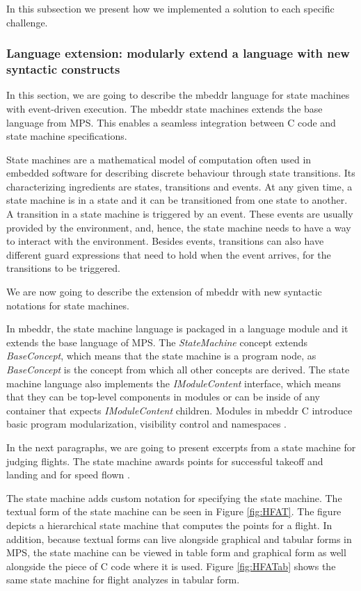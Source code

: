 \documentclass[preprint,numbers,10pt]{sigplanconf}
\begin{document}
In this subsection we present how we implemented a solution to each specific challenge.

\subsubsection{Language extension: modularly extend a language with new syntactic constructs}
\label{evr:langext}

In this section, we are going to describe the mbeddr language for state
machines with event-driven execution. The mbeddr state machines extends
the base language from MPS. This enables a seamless integration between
C code and state machine specifications.

State machines are a mathematical model of computation often used in embedded software
for describing discrete behaviour through state transitions. Its characterizing
ingredients are states, transitions and events. At any given time, a state
machine is in a state and it can be transitioned from one state to another.
A transition in a state machine is triggered by an event. These events
are usually provided by the environment, and, hence, the state machine
needs to have a way to interact with the environment. Besides events,
transitions can also have different guard expressions that need to hold when
the event arrives, for the transitions to be triggered.

We are now going to describe the extension of mbeddr with new syntactic notations for state machines.

In mbeddr, the state machine language is packaged in a language module and it
extends the base language of MPS. The \emph{StateMachine} concept extends
\emph{BaseConcept}, which means that the state machine is a program node,
as \emph{BaseConcept} is the concept from which all other concepts are derived.
The state machine language also implements the \emph{IModuleContent} interface,
which means that they can be top-level components in modules or can be inside of any
container that expects \emph{IModuleContent} children. Modules in mbeddr C
introduce basic program modularization, visibility control and namespaces \cite{voelter2013mbeddr}.

In the next paragraphs, we are going to present excerpts from a state machine for
judging flights. The state machine awards points for successful
takeoff and landing and for speed flown \cite{voelter2014generic}.

The state machine adds custom notation for specifying the state machine. The textual
form of the state machine can be seen in Figure \ref{fig:HFAT}. The figure depicts a hierarchical state machine
that computes the points for a flight.
In addition, because textual forms can live alongside graphical and tabular forms in MPS, 
the state machine can be viewed in table form and graphical form as well alongside the piece of C code
where it is used. Figure \ref{fig:HFATab} shows the same state machine for flight analyzes in tabular form.
\end{document}
